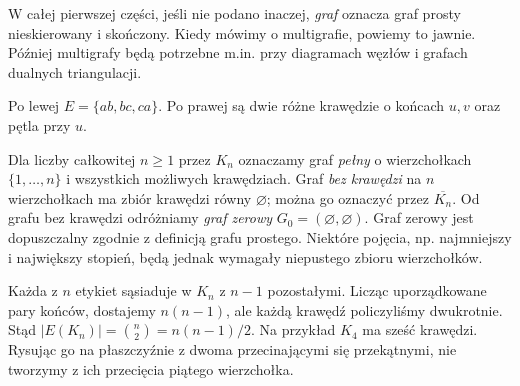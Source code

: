 W całej pierwszej części, jeśli nie podano inaczej, \emph{graf} oznacza
graf prosty nieskierowany i skończony. Kiedy mówimy o multigrafie,
powiemy to jawnie. Później multigrafy będą potrzebne m.in.
przy diagramach węzłów i grafach dualnych triangulacji.

\begin{center}

{\footnotesize Po lewej $E=\{ab,bc,ca\}$. Po prawej są dwie różne
krawędzie o końcach $u,v$ oraz pętla przy $u$.}
\end{center}

\begin{definicja}
Dla liczby całkowitej $n\ge 1$ przez $K_n$ oznaczamy graf
\emph{pełny} o wierzchołkach $\{1,\ldots,n\}$ i wszystkich
możliwych krawędziach. Graf \emph{bez krawędzi} na $n$
wierzchołkach ma zbiór krawędzi równy $\varnothing$;
można go oznaczyć przez $\overline{K_n}$.
Od grafu bez krawędzi odróżniamy \emph{graf zerowy}
$G_0=(\varnothing,\varnothing)$. Graf zerowy jest dopuszczalny zgodnie z definicją grafu prostego.
Niektóre pojęcia, np. najmniejszy i największy stopień,
będą jednak wymagały niepustego zbioru wierzchołków.
\end{definicja}

\begin{przyklad}
Każda z $n$ etykiet sąsiaduje w $K_n$ z $n-1$ pozostałymi.
Licząc uporządkowane pary końców, dostajemy $n(n-1)$,
ale każdą krawędź policzyliśmy dwukrotnie. Stąd
$|E(K_n)|=\binom n2=n(n-1)/2$.
Na przykład $K_4$ ma sześć krawędzi. Rysując go na płaszczyźnie
z dwoma przecinającymi się przekątnymi, nie tworzymy z ich
przecięcia piątego wierzchołka.
\end{przyklad}


